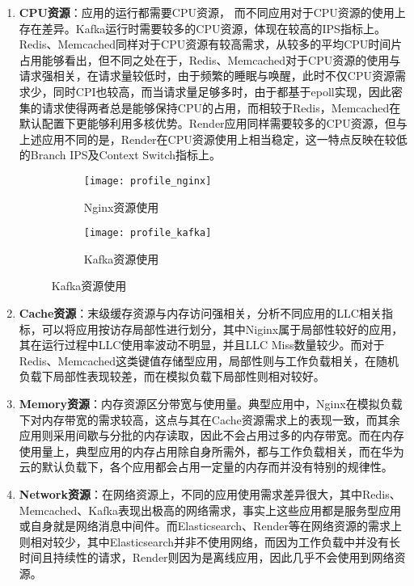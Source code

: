 \begin{enumerate}
    \item \textbf{CPU资源}：应用的运行都需要CPU资源， 而不同应用对于CPU资源的使用上存在差异。Kafka运行时需要较多的CPU资源，体现在较高的IPS指标上。Redis、Memcached同样对于CPU资源有较高需求，从较多的平均CPU时间片占用能够看出，但不同之处在于，Redis、Memcached对于CPU资源的使用与请求强相关，在请求量较低时，由于频繁的睡眠与唤醒，此时不仅CPU资源需求少，同时CPI也较高，而当请求量足够多时，由于都基于epoll实现，因此密集的请求使得两者总是能够保持CPU的占用，而相较于Redis，Memcached在默认配置下更能够利用多核优势。Render应用同样需要较多的CPU资源，但与上述应用不同的是，Render在CPU资源使用上相当稳定，这一特点反映在较低的Branch IPS及Context Switch指标上。

\begin{figure}[H]
    \centering
    \begin{subfigure}[b]{0.85\textwidth}
      \texttt{[image: profile\_nginx]}
      \caption{Nginx资源使用}
      \label{fig:profile_nginx}
    \end{subfigure}
    \begin{subfigure}[b]{0.85\textwidth}
        \texttt{[image: profile\_kafka]}
        \caption{Kafka资源使用}
        \label{fig:profile_kafka}
    \end{subfigure}
\label{fig:resource_affinity_1}
\end{figure}


    \item \textbf{Cache资源}：末级缓存资源与内存访问强相关，分析不同应用的LLC相关指标，可以将应用按访存局部性进行划分，其中Niginx属于局部性较好的应用，其在运行过程中LLC使用率波动不明显，并且LLC Miss数量较少。而对于Redis、Memcached这类键值存储型应用，局部性则与工作负载相关，在随机负载下局部性表现较差，而在模拟负载下局部性则相对较好。
    
    \item \textbf{Memory资源}：内存资源区分带宽与使用量。典型应用中，Nginx在模拟负载下对内存带宽的需求较高，这点与其在Cache资源需求上的表现一致，而其余应用则采用间歇与分批的内存读取，因此不会占用过多的内存带宽。而在内存使用量上，典型应用的内存占用除自身所需外，都与工作负载相关，而在华为云的默认负载下，各个应用都会占用一定量的内存而并没有特别的规律性。
    
    \item \textbf{Network资源}：在网络资源上，不同的应用使用需求差异很大，其中Redis、Memcached、Kafka表现出极高的网络需求，事实上这些应用都是服务型应用或自身就是网络消息中间件。而Elasticsearch、Render等在网络资源的需求上则相对较少，其中Elasticsearch并非不使用网络，而因为工作负载中并没有长时间且持续性的请求，Render则因为是离线应用，因此几乎不会使用到网络资源。


\end{enumerate}
